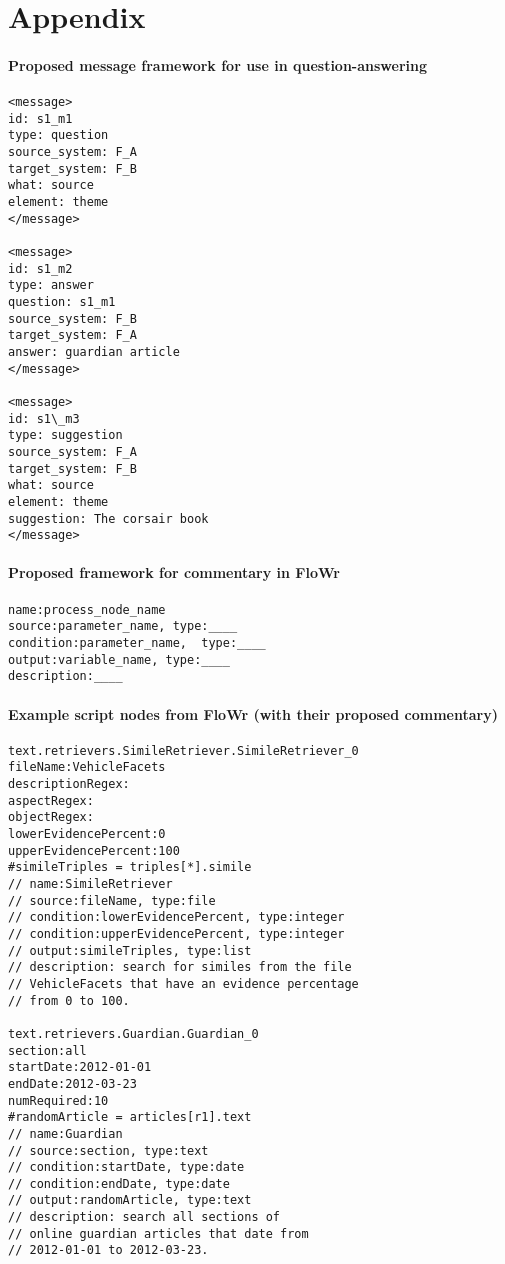 \section*{Appendix} \label{sec:appendix}

\paragraph{Proposed message framework for use in question-answering}
\begin{verbatim}
<message> 
id: s1_m1 
type: question 
source_system: F_A 
target_system: F_B 
what: source 
element: theme 
</message>

<message> 
id: s1_m2 
type: answer 
question: s1_m1 
source_system: F_B 
target_system: F_A 
answer: guardian article 
</message>

<message>
id: s1\_m3
type: suggestion 
source_system: F_A 
target_system: F_B 
what: source 
element: theme 
suggestion: The corsair book 
</message>
\end{verbatim}

\paragraph{Proposed framework for commentary in FloWr}

\begin{verbatim}
name:process_node_name
source:parameter_name, type:____
condition:parameter_name,  type:____
output:variable_name, type:____
description:____ 
\end{verbatim}

\paragraph{Example script nodes from FloWr (with their proposed commentary)}

\begin{verbatim}
text.retrievers.SimileRetriever.SimileRetriever_0
fileName:VehicleFacets
descriptionRegex:
aspectRegex:
objectRegex:
lowerEvidencePercent:0
upperEvidencePercent:100
#simileTriples = triples[*].simile
// name:SimileRetriever
// source:fileName, type:file
// condition:lowerEvidencePercent, type:integer
// condition:upperEvidencePercent, type:integer
// output:simileTriples, type:list
// description: search for similes from the file
// VehicleFacets that have an evidence percentage
// from 0 to 100.

text.retrievers.Guardian.Guardian_0
section:all
startDate:2012-01-01
endDate:2012-03-23
numRequired:10
#randomArticle = articles[r1].text
// name:Guardian
// source:section, type:text
// condition:startDate, type:date
// condition:endDate, type:date
// output:randomArticle, type:text
// description: search all sections of 
// online guardian articles that date from
// 2012-01-01 to 2012-03-23.
\end{verbatim}

